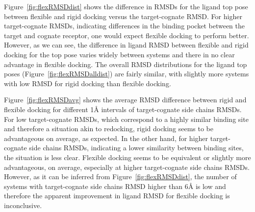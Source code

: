 \documentclass[journal=jcisd8,manuscript=article]{achemso}
\begin{document}
Figure~\ref{fig:flexRMSDdist} shows the difference in RMSDs for the ligand top pose between flexible and rigid docking versus the target-cognate RMSD. For higher target-cognate RMSDs, indicating differences in the binding pocket between the target and cognate receptor, one would expect flexible docking to perform better. However, as we can see, the difference in ligand RMSD between flexible and rigid docking for the top pose varies widely between systems and there in no clear advantage in flexible docking. The overall RMSD distributions for the ligand top poses  (Figure~\ref{fig:flexRMSDalldist}) are fairly similar, with slightly more systems with low RMSD for rigid docking than flexible docking.

Figure~\ref{fig:flexRMSDavg} shows the average RMSD difference between rigid and flexible docking for different 1{\AA} intervals of target-cognate side chains RMSDs. For low target-cognate RMSDs, which correspond to a highly similar binding site and therefore a situation akin to redocking, rigid docking seems to be advantageous on average, as expected. In the other hand, for higher target-cognate side chains RMSDs, indicating a lower similarity between binding sites, the situation is less clear. Flexible docking seems to be equivalent or slightly more advantageous, on average, especially at higher target-cognate side chains RMSDs. However, as it can be inferred from Figure~\ref{fig:flexRMSDdist}, the number of systems with target-cognate side chains RMSD higher than 6{\AA} is low and therefore the apparent improvement in ligand RMSD for flexible docking is inconclusive.
\end{document}
